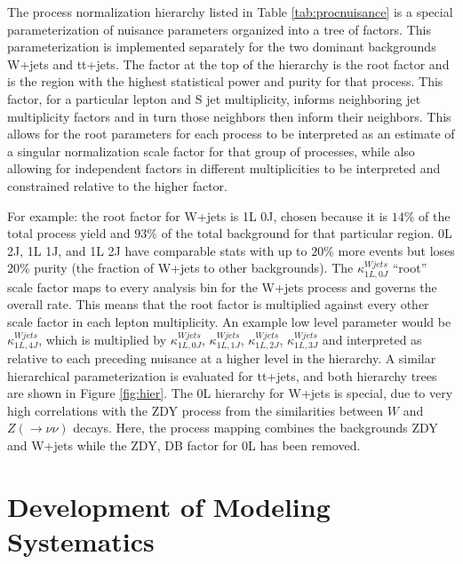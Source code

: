 The process normalization hierarchy listed in Table \ref{tab:procnuisance} is a special parameterization of nuisance parameters organized into a tree of factors. This parameterization is implemented separately for the two dominant backgrounds W+jets and tt+jets. The factor at the top of the hierarchy is the root factor and is the region with the highest statistical power and purity for that process. This factor, for a particular lepton and S jet multiplicity, informs neighboring jet multiplicity factors and in turn those neighbors then inform their neighbors. This allows for the root parameters for each process to be interpreted as an estimate of a singular normalization scale factor for that group of processes, while also allowing for independent factors in different multiplicities to be interpreted and constrained relative to the higher factor. 

For example: the root factor for W+jets is 1L 0J, chosen because it is $14\%$ of the total process yield and $93\%$ of the total background for that particular region. 0L 2J, 1L 1J, and 1L 2J have comparable stats with up to $20\%$ more events but loses $20\%$ purity (the fraction of W+jets to other backgrounds). The $\kappa^{Wjets}_{1L, 0J}$ ``root'' scale factor maps to every analysis bin for the W+jets process and governs the overall rate. This means that the root factor is multiplied against every other scale factor in each lepton multiplicity. An example low level parameter would be $\kappa^{Wjets}_{1L, 4J}$, which is multiplied by $\kappa^{Wjets}_{1L, 0J}$, $\kappa^{Wjets}_{1L, 1J}$, $\kappa^{Wjets}_{1L ,2J}$, $\kappa^{Wjets}_{1L, 3J}$ and interpreted as relative to each preceding nuisance at a higher level in the hierarchy.  A similar hierarchical parameterization is evaluated for tt+jets, and both hierarchy trees are shown in Figure \ref{fig:hier}. The 0L hierarchy for W+jets is special, due to very high correlations with the ZDY process from the similarities between $W$ and $Z(\rightarrow\nu\nu)$ decays. Here, the process mapping combines the backgrounds ZDY and W+jets while the ZDY, DB factor for 0L has been removed. 

\section{Development of Modeling Systematics}


